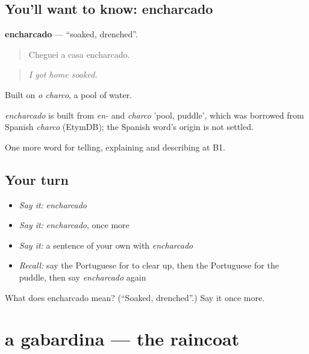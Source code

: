 \subsection*{You'll want to know: encharcado}
\textbf{encharcado} — \textquotedblleft{}soaked, drenched\textquotedblright{}.

\begin{quote}
Cheguei a casa encharcado.
\end{quote}

\begin{quote}
\emph{I got home soaked.}
\end{quote}

Built on \emph{o charco}, a pool of water.

\begin{cousinweb}
\emph{encharcado} is built from \emph{en-} and \emph{charco} 'pool, puddle', which was borrowed from Spanish \emph{charco} (EtymDB); the Spanish word's origin is not settled.
\end{cousinweb}

\begin{grammarlens}[title={What you've built}]
One more word for telling, explaining and describing at B1.
\end{grammarlens}

\subsection*{Your turn}
\begin{itemize}
\raggedright
  \item \emph{Say it:} \emph{encharcado}
  \item \emph{Say it:} \emph{encharcado}, once more
  \item \emph{Say it:} a sentence of your own with \emph{encharcado}
  \item \emph{Recall:} say the Portuguese for to clear up, then the Portuguese for the puddle, then say \emph{encharcado} again
\end{itemize}

\begin{tcolorbox}[breakable,colback=teal!4,colframe=teal!35!black,title={Before you move on}]
What does encharcado mean? (\textquotedblleft{}Soaked, drenched\textquotedblright{}.) Say it once more.
\end{tcolorbox}
\section[a gabardina]{a gabardina — the raincoat}

